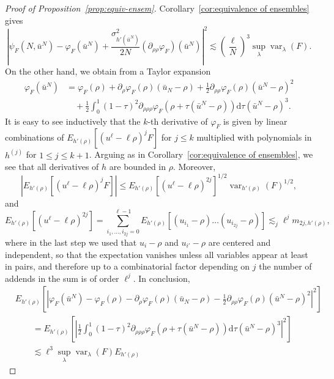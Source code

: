 \documentclass[11pt, a4paper]{article}
\newcommand{\mathd}{\mathrm{d}}
\newcommand{\tmop}[1]{\ensuremath{\operatorname{#1}}}
\newcommand{\1}{\mathbf{1}}
\begin{document}
\begin{proof}[Proof of Proposition~\ref{prop:equiv-ensem}]
  Corollary~\ref{cor:equivalence of ensembles} gives
  \[ \left| \psi_F (N, \bar{u}^N) - \varphi_F (\bar{u}^N) + \frac{\sigma_{h'
     (\bar{u}^N)}^2}{2 N} (\partial_{\rho \rho} \varphi_F) (\bar{u}^N)
     \right|^2 \lesssim \left( \frac{\ell}{N} \right)^3 \sup_{\lambda}
     \tmop{var}_{\lambda} (F) . \]
  On the other hand, we obtain from a Taylor expansion
  \begin{align*}
   \varphi_F (\bar{u}^N)
   &= \varphi_F (\rho) + \partial_{\rho} \varphi_F (\rho) (\bar{u}_N - \rho) + \frac{1}{2} \partial_{\rho \rho} \varphi_F (\rho) (\bar{u}^N - \rho)^2 \\
   &\quad + \frac{1}{2} \int_0^1 (1 - \tau)^2 \partial_{\rho \rho \rho} \varphi_F (\rho + \tau (\bar{u}^N - \rho)) \mathd \tau (\bar{u}^N - \rho)^3.
  \end{align*}
  It is easy to see inductively that the $k$-th derivative of $\varphi_F$ is
  given by linear combinations of $E_{h' (\rho)} [(u^{\ell} - \ell \rho)^j F]$
  for $j \leqslant k$ multiplied with polynomials in $h^{(j)}$ for $1
  \leqslant j \leqslant k + 1$. Arguing as in Corollary~\ref{cor:equivalence
  of ensembles}, we see that all derivatives of $h$ are bounded in $\rho$.
  Moreover,
  \[ | E_{h' (\rho)} [(u^{\ell} - \ell \rho)^j F] | \leqslant E_{h' (\rho)}
     [(u^{\ell} - \ell \rho)^{2 j}]^{1 / 2} \tmop{var}_{h' (\rho)} (F)^{1 /
     2}, \]
  and
  \[ E_{h' (\rho)} [(u^{\ell} - \ell \rho)^{2 j}] = \sum_{i_1, \ldots, i_{2 j}
     = 0}^{\ell - 1} E_{h' (\rho)} [(u_{i_1} - \rho) \ldots (u_{i_{2 j}} -
     \rho)] \lesssim_j \ell^j m_{2 j, h' (\rho)}, \]
  where in the last step we used that $u_i - \rho$ and $u_{i'} - \rho$ are
  centered and independent, so that the expectation vanishes unless all
  variables appear at least in pairs, and therefore up to a combinatorial factor
  depending on $j$ the number of addends in the sum is of order $\ell^j$. In
  conclusion,
  \begin{align*}
   &E_{h' (\rho)} \left[ \left| \varphi_F (\bar{u}^N) - \varphi_F (\rho) -
   \partial_{\rho} \varphi_F (\rho) (\bar{u}_N - \rho) - \frac{1}{2}
   \partial_{\rho \rho} \varphi_F (\rho) (\bar{u}^N - \rho)^2 \right|^2
   \right] \\
   &\qquad= E_{h' (\rho)} \left[ \left| \frac{1}{2} \int_0^1 (1 - \tau)^2
   \partial_{\rho \rho \rho} \varphi_F (\rho + \tau (\bar{u}^N - \rho))
   \mathd \tau (\bar{u}^N - \rho)^3 \right|^2 \right] \\
   &\qquad \lesssim \ell^3 \sup_{\lambda} \tmop{var}_{\lambda} (F) E_{h' (\rho)}

\end{align*}
\end{proof}
\end{document}
